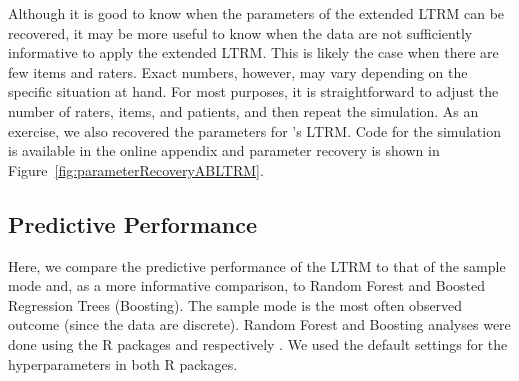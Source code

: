 \documentclass[a4paper,usenames,dvipsnames]{article}
\begin{document}
Although it is good to know when the parameters of the extended LTRM can be recovered, it may be more useful to know when the data are not sufficiently informative to apply the extended LTRM. This is likely the case when there are few items and raters. Exact numbers, however, may vary depending on the specific situation at hand. For most purposes, it is straightforward to adjust the number of raters, items, and patients, and then repeat the simulation. As an exercise, we also recovered the parameters for \AB{}'s LTRM. Code for the simulation is available in the online appendix and parameter recovery is shown in Figure~\ref{fig:parameterRecoveryABLTRM}.

\subsection*{Predictive Performance}
Here, we compare the predictive performance of the LTRM to that of the sample mode and, as a more informative comparison, to Random Forest and Boosted Regression Trees (Boosting). The sample mode is the most often observed outcome (since the data are discrete). Random Forest and Boosting analyses were done using the R packages  and  respectively \cite{ranger2017, gbmPackage}. We used the default settings for the hyperparameters in both R packages.
\end{document}
